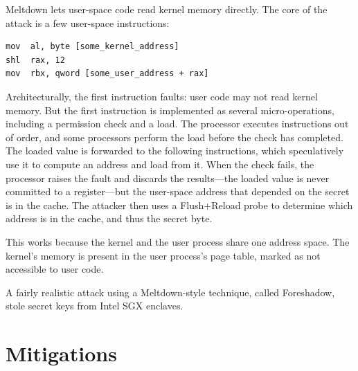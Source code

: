Meltdown lets user-space code read kernel memory directly.\autocite{lipp:meltdown}
The core of the attack is a few user-space instructions:
\begin{lstlisting}
mov  al, byte [some_kernel_address]
shl  rax, 12
mov  rbx, qword [some_user_address + rax]
\end{lstlisting}
Architecturally, the first instruction faults: user code may not read
kernel memory.
But the first instruction is implemented as several micro-operations,
including a permission check and a load.
The processor executes instructions out of order, and some processors
perform the load before the check has completed.
The loaded value is forwarded to the following instructions, which
speculatively use it to compute an address and load from it.
When the check fails, the processor raises the fault and discards the
results---the loaded value is never committed to a register---but the
user-space address that depended on the secret is in the cache.
The attacker then uses a Flush+Reload probe\autocite{yarom:flush-reload}
to determine which address is in the cache, and thus the secret byte.

This works because the kernel and the user process share one address
space.
The kernel's memory is present in the user process's page table, marked
as not accessible to user code.

A fairly realistic attack using a Meltdown-style technique, called
Foreshadow, stole secret keys from Intel SGX enclaves.\autocite{vanbulck:foreshadow}

\section{Mitigations}
\label{sec:sc:mitigations}

